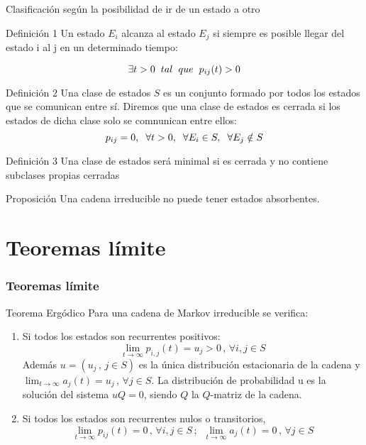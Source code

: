 \documentclass{beamer}
\begin{document}
\begin{frame}{Clasificación según la posibilidad de ir de un estado a otro}
\begin{block}{Definición 1}
   	Un estado $E_{i}$ alcanza al estado $E_{j}$ si siempre es posible llegar del estado i al j en un determinado tiempo:

   	\begin{equation*}
   		\exists t > 0 \hspace{0.2cm}tal \hspace{0.2cm} que \hspace{0.2cm} p_{ij}(t) > 0
   	\end{equation*}
\end{block}
\begin{block}{Definición 2}
Una clase de estados $S$ es un conjunto formado por todos los estados que se comunican entre sí. Diremos que una clase de estados es cerrada si los estados de dicha clase solo se comnunican entre ellos: $$p_{ij}=0, \hspace{0.2cm} \forall t >0,\hspace{0.2cm} \forall E_{i} \in S,\hspace{0.2cm} \forall E_{j} \notin S$$
\end{block}
\end{frame}
\begin{frame}
\begin{block}{Definición 3}
Una clase de estados será minimal si es cerrada y no contiene subclases propias cerradas
\end{block}
\begin{block}{Proposición}
	Una cadena irreducible no puede tener estados absorbentes. 
\end{block}
\end{frame}
\section{Teoremas límite}
\begin{frame}
    \frametitle{Teoremas límite}
    \begin{block}{Teorema Ergódico}
    Para una cadena de Markov irreducible se verifica:
	\begin{enumerate}
    \item Si todos los estados son recurrentes positivos:
$$\lim_{t\rightarrow\infty}p_{i,j}(t)=u_j>0 \, , \, \forall i,j\in S$$
Además $u=(u_j \, , \, j\in S)$ es la única distribución estacionaria de la cadena y $\displaystyle\lim_{t\rightarrow\infty}a_j (t)=u_j \, , \, \forall j\in S$. La distribución de probabilidad u es la solución del sistema $uQ=0$, siendo $Q$ la $Q$-matriz de la cadena.
\item Si todos los estados son recurrentes nulos o transitorios,
$$\lim_{t\rightarrow\infty}p_{ij}(t)=0\, , \, \forall i,j \in S\, ;\,\,\, \lim_{t\rightarrow\infty}a_j (t)=0\, , \, \forall j\in S$$
\end{enumerate}
    \end{block}
\end{frame}
\end{document}
